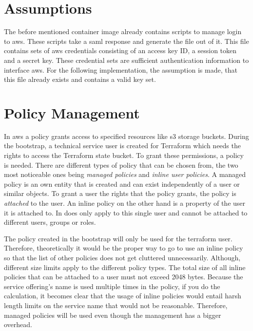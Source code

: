 \section{Assumptions}
The before mentioned container image already contains scripts to manage login to \ac{aws}.
These scripts take a \ac{saml} response and generate the file  out of it.
This file contains sets of \ac{aws} credentials consisting of an access key ID, a session token and a secret key.
These credential sets are sufficient authentication information to interface \ac{aws}.
For the following implementation, the assumption is made, that this file already exists and contains a valid key set.

\section{Policy Management}
In \ac{aws} a policy grants access to specified resources like \ac{s3} storage buckets.
During the bootstrap, a technical service user is created for Terraform which needs the rights to access the Terraform state bucket.
To grant these permissions, a policy is needed.
There are different types of policy that can be chosen from, the two most noticeable ones being \emph{managed policies} and \emph{inline user policies}.
A managed policy is an own entity that is created and can exist independently of a user or similar objects.
To grant a user the rights that the policy grants, the policy is \emph{attached} to the user.
An inline policy on the other hand is a property of the user it is attached to.
In does only apply to this single user and cannot be attached to different users, groups or roles.

The policy created in the bootstrap will only be used for the terraform user.
Therefore, theoretically it would be the proper way to go to use an inline policy so that the list of other policies does not get cluttered unnecessarily.
Although, different size limits apply to the different policy types.
The total size of all inline policies that can be attached to a user must not exceed 2048 bytes.
Because the service offering's name is used multiple times in the policy, if you do the calculation, it becomes clear that the usage of inline policies would entail harsh length limits on the service name that would not be reasonable.
Therefore, managed policies will be used even though the management has a bigger overhead.